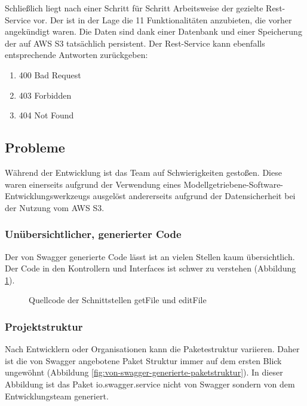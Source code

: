 \documentclass[a4paper,twoside]{article}
\begin{document}
	Schlie\ss{}lich liegt nach einer Schritt f\"ur Schritt Arbeitsweise der gezielte Rest-Service vor. Der ist in der Lage die 11 Funktionalit\"aten anzubieten, die vorher angek\"undigt waren. Die Daten sind dank einer Datenbank und einer Speicherung der auf AWS S3 tats\"achlich persistent. Der Rest-Service kann ebenfalls entsprechende Antworten zur\"uckgeben:
	\begin{enumerate}
		\item 400 Bad Request
		\item 403 Forbidden
		\item 404 Not Found
	\end{enumerate}
	
	\subsection{Probleme}
	
	W\"ahrend der Entwicklung ist das Team auf Schwierigkeiten gesto\ss{}en. Diese waren einerseits aufgrund der Verwendung eines Modellgetriebene-Software-Entwicklungswerkzeugs ausgel\"ost andererseits aufgrund der Datensicherheit bei der Nutzung vom AWS S3.
	
	\subsubsection{Un\"ubersichtlicher, generierter Code}
	
	Der von Swagger generierte Code l\"asst ist an vielen Stellen kaum \"ubersichtlich. Der Code in den Kontrollern und Interfaces ist schwer zu verstehen  (Abbildung \ref{fig:quellcode-der-schnittstellen-getFile-und-editFile}). 
	
	\begin{figure}[ht]
		\centering
		{}
		\caption{Quellcode der Schnittstellen getFile und editFile}
		\label{fig:quellcode-der-schnittstellen-getFile-und-editFile}
	\end{figure}
	
	\subsubsection{Projektstruktur}
	
	Nach Entwicklern oder Organisationen kann die Paketestruktur variieren. Daher ist die von Swagger angebotene Paket Struktur  immer auf dem ersten Blick ungew\"ohnt (Abbildung \ref{fig:von-swagger-generierte-paketstruktur}). In dieser Abbildung ist das Paket io.swagger.service nicht von Swagger sondern von dem Entwicklungsteam generiert.
	
\end{document}
